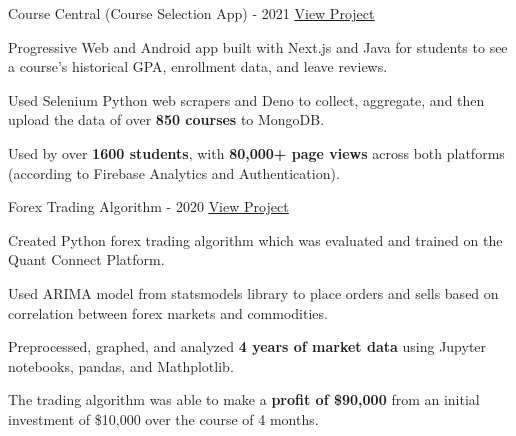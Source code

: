 

\begin{cventries}

  \cventry
    {} %
    {Course Central (Course Selection App) - 2021} %
    {\href{https://coursecentral.ca/}{\underline{View Project}}} %
    {} %
    {
      \begin{cvitems} %
        \item {Progressive Web and Android app built with Next.js and Java for students to see a course's historical GPA, enrollment data, and leave reviews.}
        \item {Used Selenium Python web scrapers and Deno to collect, aggregate, and then upload the data of over \textbf{850 courses} to MongoDB.}
        \item {Used by over \textbf{1600 students}, with \textbf{80,000+ page views} across both platforms (according to Firebase Analytics and Authentication).}
      \end{cvitems}
    }

  \cventry
    {} %
    {Forex Trading Algorithm - 2020} %
    {\href{https://github.com/KnlnKS/Forex-Price-Predictor-Quantconnect}{\underline{View Project}}} %
    {} %
    {
      \begin{cvitems} %
        \item {Created Python forex trading algorithm which was evaluated and trained on the Quant Connect Platform.}
        \item {Used ARIMA model from statsmodels library to place orders and sells based on correlation between forex markets and commodities.}
        \item {Preprocessed, graphed, and analyzed \textbf{4 years of market data} using Jupyter notebooks, pandas, and Mathplotlib.}
        \item {The trading algorithm was able to make a \textbf{profit of \$90,000} from an initial investment of \$10,000 over the course of 4 months.}
      \end{cvitems}
    }


\end{cventries}
